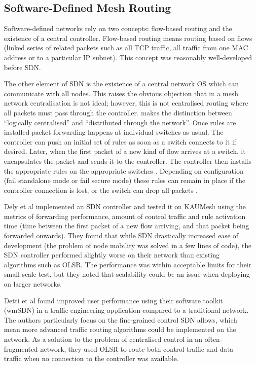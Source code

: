 \subsection{Software-Defined Mesh Routing}
Software-defined networks rely on two concepts: flow-based routing and the existence of a central controller. Flow-based routing means routing based on flows (linked series of related packets such as all TCP traffic, all traffic from one MAC address or to a particular IP subnet). This concept was reasonably well-developed \cite{wellons:oblivious,wang:routing} before SDN.

The other element of SDN is the existence of a central network OS which can communicate with all nodes. This raises the obvious objection that in a mesh network centralisation is not ideal; however, this is not centralised routing where all packets must pass through the controller. \cite{handigol:asterix} makes the distinction between ``logically centralised'' and ``distributed through the network''. Once rules are installed packet forwarding happens at individual switches as usual. The controller can push an initial set of rules as soon as a switch connects to it if desired. Later, when the first packet of a new kind of flow arrives at a switch, it encapsulates the packet and sends it to the controller. The controller then installs the appropriate rules on the appropriate switches \cite{mckeown:sdn}. Depending on configuration (fail standalone mode or fail secure mode) these rules can remain in place if the controller connection is lost, or the switch can drop all packets \cite{onf:switch140}.

Dely et al \cite{dely:wmn} implemented an SDN controller and tested it on KAUMesh using the metrics of forwarding performance, amount of control traffic and rule activation time (time between the first packet of a new flow arriving, and that packet being forwarded onwards). They found that while SDN drastically increased ease of development (the problem of node mobility was solved in a few lines of code), the SDN controller performed slightly worse on their network than existing algorithms such as OLSR. The performance was within acceptable limits for their small-scale test, but they noted that scalability could be an issue when deploying on larger networks.

Detti et al \cite{detti:wmsdn} found improved user performance using their software toolkit (wmSDN) in a traffic engineering application compared to a traditional network. The authors particularly focus on the fine-grained control SDN allows, which mean more advanced traffic routing algorithms could be implemented on the network. As a solution to the problem of centralised control in an often-fragmented network, they used OLSR to route both control traffic and data traffic when no connection to the controller was available.

